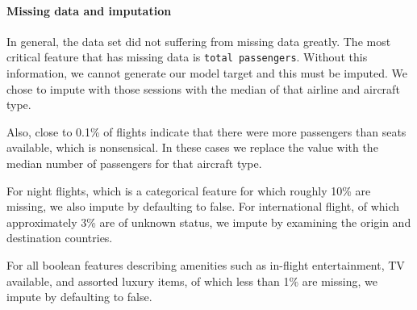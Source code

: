 \documentclass[]{article}
\let\oldparagraph\paragraph
\renewcommand{\paragraph}[1]{\oldparagraph{#1}\mbox{}}
\begin{document}
\hypertarget{missing-data-and-imputation}{%
\paragraph{Missing data and
imputation}\label{missing-data-and-imputation}}

In general, the data set did not suffering from missing data greatly.
The most critical feature that has missing data is
\texttt{total\ passengers}. Without this information, we cannot generate
our model target and this must be imputed. We chose to impute with those
sessions with the median of that airline and aircraft type.

Also, close to 0.1\% of flights indicate that there were more passengers
than seats available, which is nonsensical. In these cases we replace
the value with the median number of passengers for that aircraft type.

For night flights, which is a categorical feature for which roughly 10\%
are missing, we also impute by defaulting to false. For international
flight, of which approximately 3\% are of unknown status, we impute by
examining the origin and destination countries.

For all boolean features describing amenities such as in-flight
entertainment, TV available, and assorted luxury items, of which less
than 1\% are missing, we impute by defaulting to false.
\end{document}
